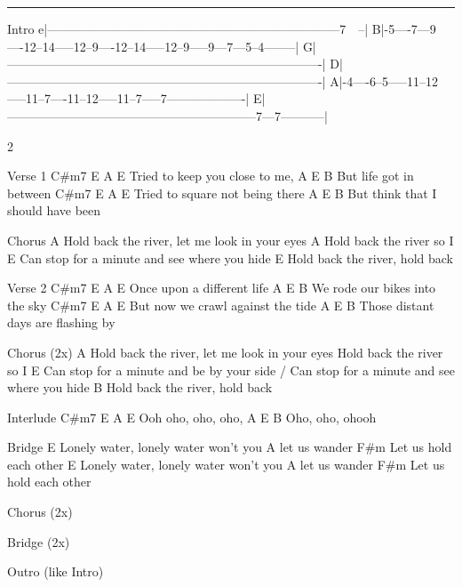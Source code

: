 \noindent\rule{\columnwidth}{1pt}

\begin{lsttab}
Intro
e|-----------------------------------------------------------------------7~~--|
B|-5----7---9----12--14-----12--9----12--14-----12--9-----9---7---5--4--------|
G|----------------------------------------------------------------------------|
D|----------------------------------------------------------------------------|
A|-4----6--5-----11--12-----11--7----11--12-----11--7-----7-------------------|
E|------------------------------------------------------------7---7-----------|
\end{lsttab}
\begin{multicols}{2}
\begin{lstsong}
Verse 1
C#m7     E          A     E
Tried to keep you close to me,
    A       E        B
But life got in between
C#m7      E         A      E
Tried to square not being there
     A        E                B
But think that I should have been

Chorus
A
Hold back the river, let me look in your eyes
A
Hold back the river so I
E
Can stop for a minute and see where you hide
E
Hold back the river, hold back
 
Verse 2
C#m7   E     A        E
Once upon a different life
    A       E                B
We rode our bikes into the sky
    C#m7     E      A        E
But now we crawl against the tide
      A       E                B
Those distant days are flashing by
 
Chorus (2x)
A
Hold back the river, let me look in your eyes
Hold back the river so I
E
Can stop for a minute and be by your side  / Can stop for a minute and see where you hide
                      B
Hold back the river, hold back
\end{lstsong}
\columnbreak
\begin{lstsong}
Interlude
C#m7 E    A   E
Ooh oho, oho, oho,
 A   E    B
Oho, oho, ohooh

Bridge
E
Lonely water, lonely water won't you 
A
let us wander
F#m
Let us hold each other
E
Lonely water, lonely water won't you
A
let us wander
F#m
Let us hold each other
 
Chorus (2x)
 
Bridge (2x)

Outro (like Intro)
\end{lstsong}
\end{multicols}

\newpage
